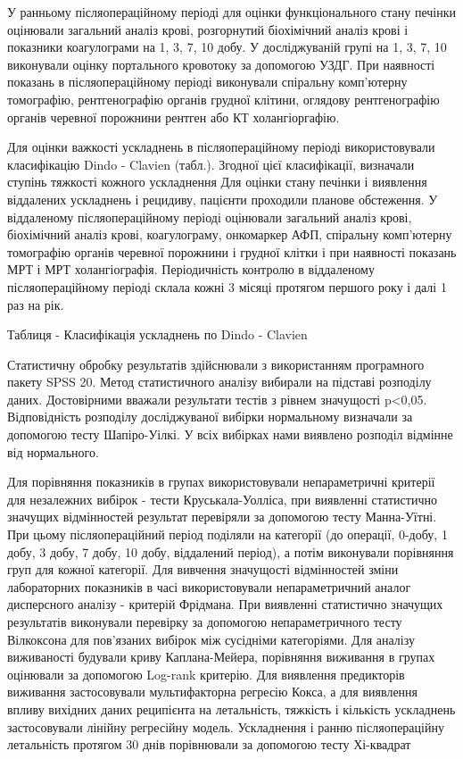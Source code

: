 У ранньому післяопераційному періоді для оцінки функціонального стану печінки оцінювали загальний аналіз крові, розгорнутий біохімічний аналіз крові і показники коагулограми на 1, 3, 7, 10 добу. У досліджуваній групі на 1, 3, 7, 10 виконували оцінку портального кровотоку за допомогою УЗДГ. При наявності показань в післяопераційному періоді виконували спіральну комп'ютерну томографію, рентгенографію органів грудної клітини, оглядову рентгенографію органів черевної порожнини рентген або КТ холангіоргафію.  

Для оцінки важкості ускладнень в післяопераційному періоді використовували класифікацію Dindo - Clavien (табл.). Згодної цієї класифікації, визначали ступінь тяжкості кожного ускладнення
Для оцінки стану печінки і виявлення віддалених ускладнень і рецидиву, пацієнти проходили планове обстеження. У віддаленому післяопераційному періоді оцінювали загальний аналіз крові, біохімічний аналіз крові, коагулограму, онкомаркер АФП, спіральну комп'ютерну томографію органів черевної порожнини і грудної клітки і при наявності показань МРТ і МРТ холангіографія. Періодичність контролю в віддаленому післяопераційному періоді склала кожні 3 місяці протягом першого року і далі 1 раз на рік.

Таблиця - Класифікація ускладнень по Dindo - Clavien 


Статистичну обробку результатів здійснювали з використанням програмного пакету SPSS 20. Метод статистичного аналізу вибирали на підставі розподілу даних. Достовірними вважали результати тестів з рівнем значущості p<0,05. Відповідність розподілу досліджуваної вибірки нормальному визначали за допомогою тесту Шапіро-Уілкі. У всіх вибірках нами виявлено розподіл відмінне від нормального.

Для порівняння показників в групах використовували непараметричні критерії для незалежних вибірок - тести Круськала-Уолліса, при виявленні статистично значущих відмінностей результат перевіряли за допомогою тесту Манна-Уїтні. При цьому післяопераційний період поділяли на категорії (до операції, 0-добу, 1 добу, 3 добу, 7 добу, 10 добу, віддалений період), а потім виконували порівняння груп для кожної категорії. Для вивчення значущості відмінностей зміни лабораторних показників в часі використовували непараметричний аналог дисперсного аналізу - критерій Фрідмана. При виявленні статистично значущих результатів виконували перевірку за допомогою непараметричного тесту Вілкоксона для пов'язаних вибірок між сусідніми категоріями. Для аналізу виживаності будували криву Каплана-Мейера, порівняння виживання в групах оцінювали за допомогою Log-rank критерію. Для виявлення предикторів виживання застосовували мультифакторна регресію Кокса, а для виявлення впливу вихідних даних реципієнта на летальність, тяжкість і кількість ускладнень застосовували лінійну регресійну модель. Ускладнення і ранню післяопераційну летальність протягом 30 днів порівнювали за допомогою тесту Хі-квадрат




